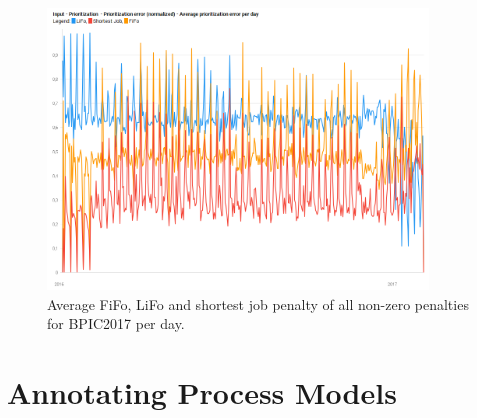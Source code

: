 \begin{figure}[h]
	\centering
    \includegraphics[width=0.9\textwidth]{figures/avg_error_nnull.png}
    \caption{Average FiFo, LiFo and shortest job penalty of all non-zero penalties for BPIC2017 per day.}
    \label{fig:error_avg_nnull}
\end{figure}

\section{Annotating Process Models}
